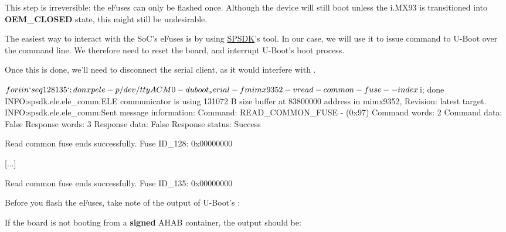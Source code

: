 \begin{warning}
\Large
This step is irreversible: the eFuses can only be flashed once. Although the device will still
boot unless the i.MX93 is transitioned into \textbf{OEM\_CLOSED} state, this might still be undesirable.
\end{warning}

The easiest way to interact with the SoC's eFuses is by using \href{https://spsdk.readthedocs.io/en/latest/}{SPSDK}'s
 tool. In our case, we will use it to issue command to U-Boot over the command line.
We therefore need to reset the board, and interrupt U-Boot's boot process.

Once this is done, we'll need to disconnect the serial client, as it would interfere with .

\begin{bashinput}
$ for i in `seq 128 135`; do nxpele -p /dev/ttyACM0 -d uboot_serial -f mimx9352 -v read-common-fuse --index $i; done
INFO:spsdk.ele.ele_comm:ELE communicator is using 131072 B size buffer at 83800000 address in mimx9352, Revision: latest target.
INFO:spsdk.ele.ele_comm:Sent message information:
Command:         READ_COMMON_FUSE - (0x97)
Command words:   2
Command data:    False
Response words:  3
Response data:   False
Response status: Success

Read common fuse ends successfully.
Fuse ID_128: 0x00000000

[...]

Read common fuse ends successfully.
Fuse ID_135: 0x00000000
\end{bashinput}

Before you flash the eFuses, take note of the output of U-Boot's :

If the board is not booting from a \textbf{signed} AHAB container, the output should be:


